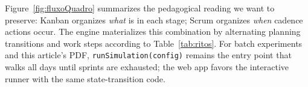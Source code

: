 Figure~\ref{fig:fluxoQuadro} summarizes the pedagogical reading we want to preserve: Kanban organizes \emph{what} is in each stage; Scrum organizes \emph{when} cadence actions occur. The engine materializes this combination by alternating planning transitions and work steps according to Table~\ref{tab:ritos}. For batch experiments and this article's PDF, \texttt{runSimulation(config)} remains the entry point that walks all days until sprints are exhausted; the web app favors the interactive runner with the same state-transition code.
